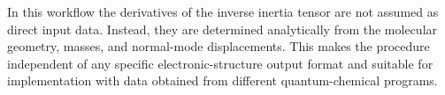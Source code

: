 \documentclass[11pt]{article}
\begin{document}
In this workflow the derivatives of the inverse inertia tensor are not assumed as direct input data. Instead, they are determined analytically from the molecular geometry, masses, and normal-mode displacements. This makes the procedure independent of any specific electronic-structure output format and suitable for implementation with data obtained from different quantum-chemical programs.
\end{document}
